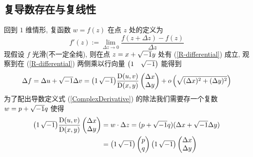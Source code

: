         \subsection{复导数存在与复线性}
            回到 $1$ 维情形, 复函数 $w = f(z)$ 在点 $z$ 处的定义为
            \begin{equation}\label{ComplexDerivative}
                f'(z) := \lim_{\Delta z\rightarrow0}\frac{f(z+\Delta z) - f(z)}{\Delta z}
            \end{equation}
            现假设 $f$ 光滑(不一定全纯), 则在点 $z=x+\sqrt{-1} y$ 处有 (\ref{R-differential}) 成立, 
            观察到在 (\ref{R-differential}) 两侧乘以行向量 
            {\setlength{\arraycolsep}{0.8pt} $\begin{pmatrix} 1 & \sqrt{-1} \end{pmatrix}$} 能得到
            \begin{equation*}
                \Delta f = \Delta u+\mi\Delta v = {\setlength{\arraycolsep}{0.8pt}\begin{pmatrix}  1 & \mi \end{pmatrix}}
                \pD{u,v}{x,y}
                \begin{pmatrix} \Delta x \\ \Delta y \end{pmatrix} + o\left(\sqrt{(\Delta x)^2+(\Delta y)^2}\right)
            \end{equation*}
            为了配出导数定义式 (\ref{ComplexDerivative}) 的除法我们需要存一个复数 $w=p+\sqrt{-1} q$ 使得
            \begin{align*}
                {\setlength{\arraycolsep}{0.8pt}\begin{pmatrix} 1 & \mi \end{pmatrix}}
                \pD{u,v}{x,y}
                \begin{pmatrix} \Delta x \\ \Delta y \end{pmatrix} &= 
                w\cdot\Delta z = (p+\mi q)(\Delta x+\mi\Delta y) \\
                &={\setlength{\arraycolsep}{0.8pt}\begin{pmatrix} 1 & \mi \end{pmatrix}}
                \begin{pmatrix} p \\ q \end{pmatrix}
                {\setlength{\arraycolsep}{0.8pt}\begin{pmatrix} 1 & \mi \end{pmatrix}}
                \begin{pmatrix} \Delta x \\ \Delta y \end{pmatrix}
            \end{align*}
